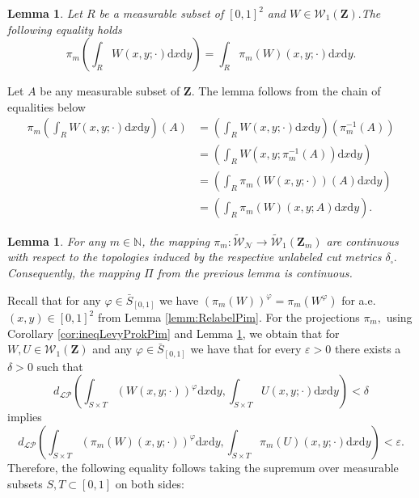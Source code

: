 \documentclass[12pt,twoside,a4paper]{article}
\newtheorem{lemma}[theorem]{Lemma}
\newcommand{\Space}{\mathbf{Z}}
\newcommand{\Graphon}{\mathcal{W}_1}
\newcommand{\UGraphon}{\widetilde{\mathcal{W}}_1}
\newcommand{\Relabel}{\bar{S}_{[0,1]}}
\begin{document}
\begin{lemma}\label{lemm:equal_pimInt}
Let $R$ be a measurable subset of $[0,1]^2$ and $W\in \Graphon(\Space).$The following equality holds
    \begin{equation*}
        \pi_m\left(\int_{R} W(x,y;\cdot) \mathrm{d}x \mathrm{d}y\right)=  \int_{R}  \pi_m\left(W\right)(x,y;\cdot) \mathrm{d}x \mathrm{d}y.
    \end{equation*}
\end{lemma}
\proof
Let $A$ be any measurable subset of $\Space.$ The lemma follows from the chain of equalities below
\begin{equation*}
\begin{aligned}
    \pi_m\left(\int_{R} W(x,y;\cdot) \mathrm{d}x \mathrm{d}y\right)(A)&=\left(\int_{R} W(x,y;\cdot) \mathrm{d}x \mathrm{d}y\right)(\pi^{-1}_m(A))\\&=\left(\int_{R} W(x,y;\pi^{-1}_m(A)) \mathrm{d}x \mathrm{d}y\right)\\
    &=\left(\int_{R} \pi_m\left(W(x,y;\cdot)\right)(A) \mathrm{d}x \mathrm{d}y\right)
    \\
    &=\left(\int_{R} \pi_m\left(W\right)(x,y;A) \mathrm{d}x \mathrm{d}y\right).
    \end{aligned}
\end{equation*}
\endproof


\begin{lemma}\label{lemm:contPiProjective}
 For any $m \in \mathbb{N}$, the mapping $\pi_m:\widetilde{\mathcal{W}}_{\mathcal{N}}\rightarrow \UGraphon(\Space_m)$ are continuous with respect to the topologies induced by the respective unlabeled cut metrics $\delta_{\square}.$ Consequently, the mapping $\Pi$ from the previous lemma is continuous.
\end{lemma}
\proof
Recall that for any $\varphi\in \Relabel$ we have $(\pi_m(W))^{\varphi}=\pi_m(W^{\varphi})$ for a.e.\ $(x,y)\in [0,1]^2$ from Lemma \ref{lemm:RelabelPim}.
For the projections $\pi_{m},$ using Corollary \ref{cor:ineqLevyProkPim} and Lemma \ref{lemm:contPiProjective}, we obtain that for $W,U\in \Graphon(\Space)$ and any $\varphi\in \Relabel$ we have that for every $\varepsilon>0$ there exists a $\delta>0$  such that 
\begin{equation*}
    d_\mathcal{LP}\left(\int_{S\times T}  (W(x,y;\cdot))^{\varphi} \mathrm{d}x \mathrm{d}y,\int_{S\times T} U(x,y;\cdot) \mathrm{d}x \mathrm{d}y\right)<\delta
\end{equation*}
implies \begin{equation*}
      d_\mathcal{LP}\left(\int_{S\times T}  (\pi_m\left(W\right)(x,y;\cdot))^{\varphi} \mathrm{d}x \mathrm{d}y,\int_{S\times T}  \pi_m\left(U\right)(x,y;\cdot) \mathrm{d}x \mathrm{d}y\right)<\varepsilon.
\end{equation*}
Therefore, the following equality follows taking the supremum over measurable subsets $S,T\subset[0,1]$ on both sides:
\end{document}
